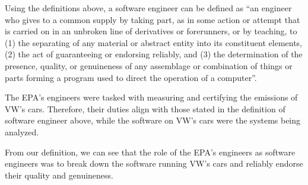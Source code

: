 Using the definitions above, a software engineer can be defined as ``an engineer who gives to a common supply by taking part, as in some action or attempt that is carried on in an unbroken line of derivatives or forerunners, or by teaching, to (1) the separating of any material or abstract entity into its constituent elements, (2) the act of guaranteeing or endorsing reliably, and (3) the determination of the presence, quality, or genuineness of any assemblage or combination of things or parts forming a program used to direct the operation of a computer''.

The EPA's engineers were tasked with measuring and certifying the emissions of VW's cars\cite{epa_track}. Therefore, their duties align with those stated in the definition of software engineer above, while the software on VW's cars were the systems being analyzed.

From our definition, we can see that the role of the EPA's engineers as software engineers was to break down the software running VW's cars and reliably endorse their quality and genuineness.
